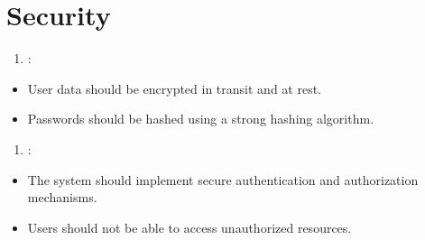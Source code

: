 \documentclass[letterpaper,10pt,english]{sphinxmanual}
\begin{document}
\section{Security}
\label{\detokenize{modules/requirements:security}}\begin{enumerate}
%
\setcounter{enumi}{2}
\item {} 
\sphinxAtStartPar
{}:

\end{enumerate}
\begin{itemize}
\item {} 
\sphinxAtStartPar
User data should be encrypted in transit and at rest.

\item {} 
\sphinxAtStartPar
Passwords should be hashed using a strong hashing algorithm.

\end{itemize}
\begin{enumerate}
%
\setcounter{enumi}{3}
\item {} 
\sphinxAtStartPar
{}:

\end{enumerate}
\begin{itemize}
\item {} 
\sphinxAtStartPar
The system should implement secure authentication and authorization mechanisms.

\item {} 
\sphinxAtStartPar
Users should not be able to access unauthorized resources.

\end{itemize}
\end{document}
